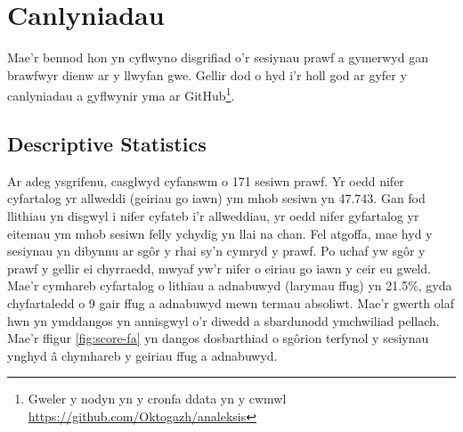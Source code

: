 ﻿\chapter{Canlyniadau}
Mae'r bennod hon yn cyflwyno disgrifiad o'r sesiynau prawf a gymerwyd gan brawfwyr dienw ar y llwyfan gwe. Gellir dod o hyd i'r holl god ar gyfer y canlyniadau a gyflwynir yma ar GitHub\footnote{Gweler y nodyn yn y cronfa ddata yn y cwmwl \url{https://github.com/Oktogazh/analeksis}}.

\section{Descriptive Statistics}
Ar adeg ysgrifenu, casglwyd cyfanswm o 171 sesiwn prawf. Yr oedd nifer cyfartalog yr allweddi (geiriau go iawn) ym mhob sesiwn yn 47.743. Gan fod llithiau yn disgwyl i nifer cyfateb i'r allweddiau, yr oedd nifer gyfartalog yr eitemau ym mhob sesiwn felly ychydig yn llai na chan. Fel atgoffa, mae hyd y sesiynau yn dibynnu ar sgôr y rhai sy'n cymryd y prawf. Po uchaf yw sgôr y prawf y gellir ei chyrraedd, mwyaf yw'r nifer o eiriau go iawn y ceir eu gweld. Mae'r cymhareb cyfartalog o lithiau a adnabuwyd (larymau ffug) yn 21.5\%, gyda chyfartaledd o 9 gair ffug a adnabuwyd mewn termau absoliwt. Mae'r gwerth olaf hwn yn ymddangos yn annisgwyl o'r diwedd a sbardunodd ymchwiliad pellach. Mae'r ffigur \ref{fig:score-fa} yn dangos dosbarthiad o sgôrion terfynol y sesiynau ynghyd â chymhareb y geiriau ffug a adnabuwyd.

